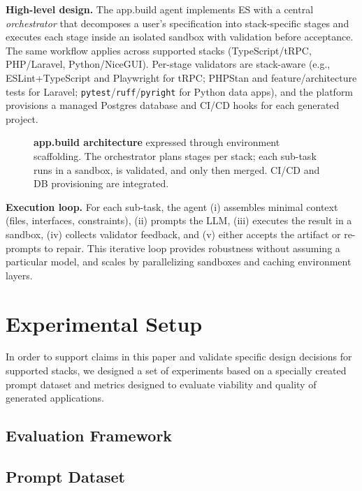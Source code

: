 \documentclass{article}
\begin{document}
\textbf{High-level design.} The app.build agent implements ES with a central \emph{orchestrator} that decomposes a user's specification into stack-specific stages and executes each stage inside an isolated sandbox with validation before acceptance. The same workflow applies across supported stacks (TypeScript/tRPC, PHP/Laravel, Python/NiceGUI). Per-stage validators are stack-aware (e.g., ESLint+TypeScript and Playwright for tRPC; PHPStan and feature/architecture tests for Laravel; \texttt{pytest}/\texttt{ruff}/\texttt{pyright} for Python data apps), and the platform provisions a managed Postgres database and CI/CD hooks for each generated project.

\begin{figure}[t]
  \centering
  
  \vspace{-0.5em}
  \caption{\textbf{app.build architecture} expressed through environment scaffolding. The orchestrator plans stages per stack; each sub-task runs in a sandbox, is validated, and only then merged. CI/CD and DB provisioning are integrated.}
  \label{fig:appbuild-arch}
\end{figure}

\textbf{Execution loop.} For each sub-task, the agent (i) assembles minimal context (files, interfaces, constraints), (ii) prompts the LLM, (iii) executes the result in a sandbox, (iv) collects validator feedback, and (v) either accepts the artifact or re-prompts to repair. This iterative loop provides robustness without assuming a particular model, and scales by parallelizing sandboxes and caching environment layers.

\section{Experimental Setup}
\label{sec:experimental-setup}

In order to support claims in this paper and validate specific design decisions for supported stacks, we designed a set of experiments based on a specially created prompt dataset and metrics designed to evaluate viability and quality of generated applications.

\subsection{Evaluation Framework}

\subsection{Prompt Dataset}
\label{sec:prompt-dataset-desc}
\end{document}
